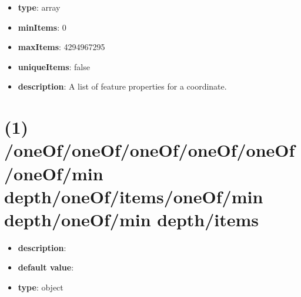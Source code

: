 \begin{itemize}[leftmargin=0em]\item {\bf type}: array
\item {\bf minItems}: 0
\item {\bf maxItems}: 4294967295
\item {\bf uniqueItems}: false
\item {\bf description}: A list of feature properties for a coordinate.
\end{itemize}\section{(1) /oneOf/oneOf/oneOf/oneOf/oneOf/oneOf/min depth/oneOf/items/oneOf/min depth/oneOf/min depth/items}
\begin{itemize}[leftmargin=1em]\item {\bf description}: 
\item {\bf default value}: 
\item {\bf type}: object
\end{itemize}
